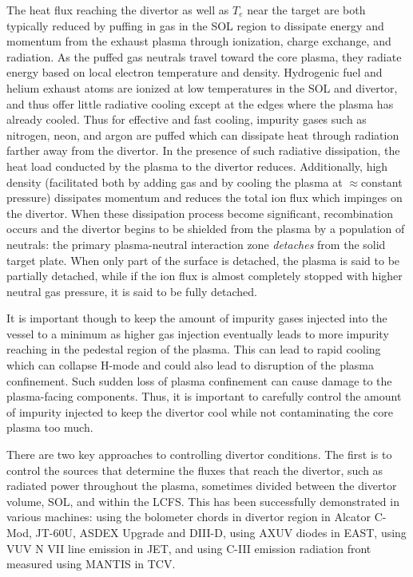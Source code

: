 The heat flux reaching the divertor as well as $T_e$ near the target are both typically reduced by puffing in gas in the \ac{SOL} region to dissipate energy and momentum from the exhaust plasma through ionization, charge exchange, and radiation.
As the puffed gas neutrals travel toward the core plasma, they radiate energy based on local electron temperature and density.
Hydrogenic fuel and helium exhaust atoms are ionized at low temperatures in the \ac{SOL} and divertor, and thus offer little radiative cooling except at the edges where the plasma has already cooled.
Thus for effective and fast cooling, impurity gases such as nitrogen, neon, and argon are puffed which can dissipate heat through radiation farther away from the divertor.
In the presence of such radiative dissipation, the heat load conducted by the plasma to the divertor reduces.
Additionally, high density (facilitated both by adding gas and by cooling the plasma at $\approx$constant pressure) dissipates momentum and reduces the total ion flux which impinges on the divertor.
When these dissipation process become significant, recombination occurs and the divertor begins to be shielded from the plasma by a population of neutrals: the primary plasma-neutral interaction zone \emph{detaches} from the solid target plate.
When only part of the surface is detached, the plasma is said to be partially detached, while if the ion flux is almost completely stopped with higher neutral gas pressure, it is said to be fully detached.

It is important though to keep the amount of impurity gases injected into the vessel to a minimum as higher gas injection eventually leads to more impurity reaching in the pedestal region of the plasma.
This can lead to rapid cooling which can collapse H-mode and could also lead to disruption of the plasma confinement.
Such sudden loss of plasma confinement can cause damage to the plasma-facing components.
Thus, it is important to carefully control the amount of impurity injected to keep the divertor cool while not contaminating the core plasma too much.

There are two key approaches to controlling divertor conditions.
The first is to control the sources that determine the fluxes that reach the divertor, such as radiated power throughout the plasma, sometimes divided between the divertor volume, \ac{SOL}, and within the \ac{LCFS}.
This has been successfully demonstrated in various machines:
using the bolometer chords in divertor region in Alcator C-Mod\cite{Goetz_1999_POP}, JT-60U\cite{Asakura_2009_NF}, ASDEX Upgrade\cite{Kallenbach_2012_NF} and DIII-D\cite{Eldon_2019_NME},
using AXUV diodes in EAST\cite{Wu_2018_NF},
using VUV N VII line emission in JET\cite{Maddison_2011_NF}, and
using C-III emission radiation front measured using MANTIS in TCV\cite{Ravensbergen_2021_NC}.

